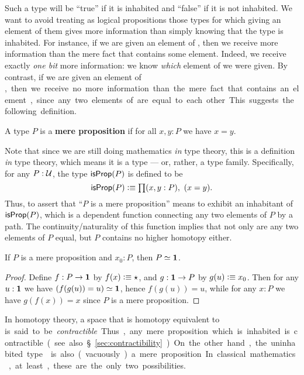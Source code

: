 Such a type will be ``true'' if it is inhabited and ``false'' if it is not inhabited.
We want to avoid treating as logical propositions those types for which giving an element of them gives more information than simply knowing that the type is inhabited.
For instance, if we are given an element of \bool, then we receive more information than the mere fact that \bool contains some element.
Indeed, we receive exactly \emph{one bit} more information: we know \emph{which} element of \bool we were given.
By contrast, if we are given an element of \unit, then we receive no more information than the mere fact that \unit contains an element, since any two elements of \unit are equal to each other.
This suggests the following definition.

\begin{defn}
  A type $P$ is a \textbf{mere proposition} if for all $x,y:P$ we have $x=y$.
\end{defn}

Note that since we are still doing mathematics \emph{in} type theory, this is a definition \emph{in} type theory, which means it is a type --- or, rather, a type family.
Specifically, for any $P:\mathcal{U}$, the type $\mathsf{isProp}(P)$ is defined to be
\[ \isprop(P) \defeq \prd{x,y:P} (x=y). \]
Thus, to assert that ``$P$ is a mere proposition'' means to exhibit an inhabitant of $\mathsf{isProp}(P)$, which is a dependent function connecting any two elements of $P$ by a path.
The continuity/naturality of this function implies that not only are any two elements of $P$ equal, but $P$ contains no higher homotopy either.

\begin{lem}\label{thm:inhabprop-eqvunit}
  If $P$ is a mere proposition and $x_0:P$, then $P \simeq \mathbf{1}$.
\end{lem}
\begin{proof}
  Define $f:P\to\mathbf{1}$ by $f(x)\vcentcolon\equiv \star$, and $g:\mathbf{1}\to P$ by $g(u)\vcentcolon\equiv x_0$.
  Then for any $u:\mathbf{1}$ we have $(f(g(u))=u) \simeq \mathbf{1}$, hence $f(g(u))=u$, while for any $x:P$ we have $g(f(x))=x$ since $P$ is a mere proposition.
\end{proof}

In homotopy theory, a space that is homotopy equivalent to \unit is said to be \emph{contractible}.
Thus, any mere proposition which is inhabited is contractible (see also \S\ref{sec:contractibility}).
On the other hand, the uninhabited type \emptyt is also (vacuously) a mere proposition.
In classical mathematics, at least, these are the only two possibilities.

